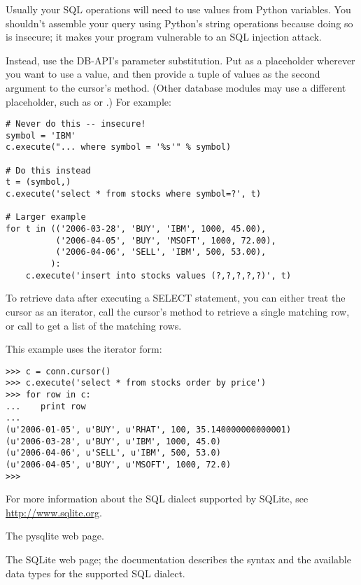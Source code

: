\documentclass{howto}
\begin{document}
Usually your SQL operations will need to use values from Python
variables.  You shouldn't assemble your query using Python's string
operations because doing so is insecure; it makes your program
vulnerable to an SQL injection attack.  

Instead, use the DB-API's parameter substitution.  Put  as a
placeholder wherever you want to use a value, and then provide a tuple
of values as the second argument to the cursor's 
method.  (Other database modules may use a different placeholder,
such as  or .) For example:

\begin{verbatim}    
# Never do this -- insecure!
symbol = 'IBM'
c.execute("... where symbol = '%s'" % symbol)

# Do this instead
t = (symbol,)
c.execute('select * from stocks where symbol=?', t)

# Larger example
for t in (('2006-03-28', 'BUY', 'IBM', 1000, 45.00),
          ('2006-04-05', 'BUY', 'MSOFT', 1000, 72.00),
          ('2006-04-06', 'SELL', 'IBM', 500, 53.00),
         ):
    c.execute('insert into stocks values (?,?,?,?,?)', t)
\end{verbatim}

To retrieve data after executing a SELECT statement, you can either 
treat the cursor as an iterator, call the cursor's 
method to retrieve a single matching row, 
or call  to get a list of the matching rows.

This example uses the iterator form:

\begin{verbatim}
>>> c = conn.cursor()
>>> c.execute('select * from stocks order by price')
>>> for row in c:
...    print row
...
(u'2006-01-05', u'BUY', u'RHAT', 100, 35.140000000000001)
(u'2006-03-28', u'BUY', u'IBM', 1000, 45.0)
(u'2006-04-06', u'SELL', u'IBM', 500, 53.0)
(u'2006-04-05', u'BUY', u'MSOFT', 1000, 72.0)
>>>
\end{verbatim}

For more information about the SQL dialect supported by SQLite, see 
\url{http://www.sqlite.org}.

\begin{seealso}

{The pysqlite web page.}

{The SQLite web page; the documentation describes the syntax and the
available data types for the supported SQL dialect.}



\end{seealso}
\end{document}
